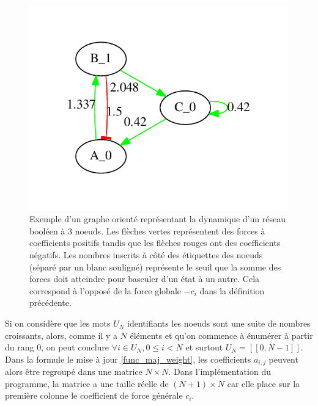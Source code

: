 \documentclass[11pt, a4paper]{article}
\begin{document}
\newpage
\begin{figure}[position]
    \begin{center}
        \includegraphics{example_weighted_graph}
        \caption{
            \label{ex_weighted_graph}
            Exemple d'un graphe orienté représentant la dynamique d'un réseau
            booléen à 3 noeuds. Les flèches vertes représentent des forces à
            coefficients positifs tandis que les flèches rouges ont des coefficients négatifs.
            Les nombres inscrits à côté des étiquettes des noeuds (séparé par
            un blanc souligné) représente le seuil que la somme des forces
            doit atteindre pour basculer d'un état à un autre.  Cela correspond
            à l'opposé de la force globale $-c_i$ dans la définition
            précédente.
        }
    \end{center}
\end{figure}

Si on considère que les mots $U_N$ identifiants les noeuds sont une suite de
nombres croissants, alors, comme il y a $N$ éléments et qu'on commence à
énumérer à partir du rang $0$, on peut conclure $ \forall i \in U_N, 0
\le i < N $ et surtout $ U_N = [\![0, N - 1]\!] $.  Dans la formule le mise à
jour \ref{func_maj_weight}, les coefficients $a_{i, j}$ peuvent alors être
regroupé dans une matrice $N\times N$.  Dans l'implémentation du programme, la
matrice a une taille réelle de $(N + 1)\times N$ car elle place sur la première
colonne le coefficient de force générale $c_i$.
\end{document}

